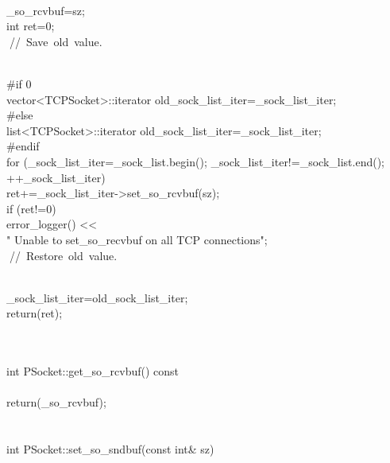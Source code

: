 \documentclass{article}
\begin{document}
 {
\\
     _so_rcvbuf=sz;
\\
         int ret=0;
\\
         
\hbox{// Save old value.}\strut\\
 #if 0
\\
         vector<TCPSocket>::iterator old_sock_list_iter=_sock_list_iter;
\\
 #else
\\
         list<TCPSocket>::iterator old_sock_list_iter=_sock_list_iter;
\\
 #endif
\\
     for (_sock_list_iter=_sock_list.begin(); _sock_list_iter!=_sock_list.end();
\\
          ++_sock_list_iter)
\\
         ret+=_sock_list_iter->set_so_rcvbuf(sz);
\\
     if (ret!=0)
\\
         error_logger() << 
\\
                                 "    Unable to set_so_recvbuf on all TCP connections\n";
\\
         
\hbox{// Restore old value.}\strut\\
         _sock_list_iter=old_sock_list_iter;
\\
         return(ret);
\\
 }
\\
 
\\
 int PSocket::get_so_rcvbuf() const
\\
 {
\\
         return(_so_rcvbuf);
\\
 }
\\
 
\\
 int PSocket::set_so_sndbuf(const int& sz)
\\
\end{document}
